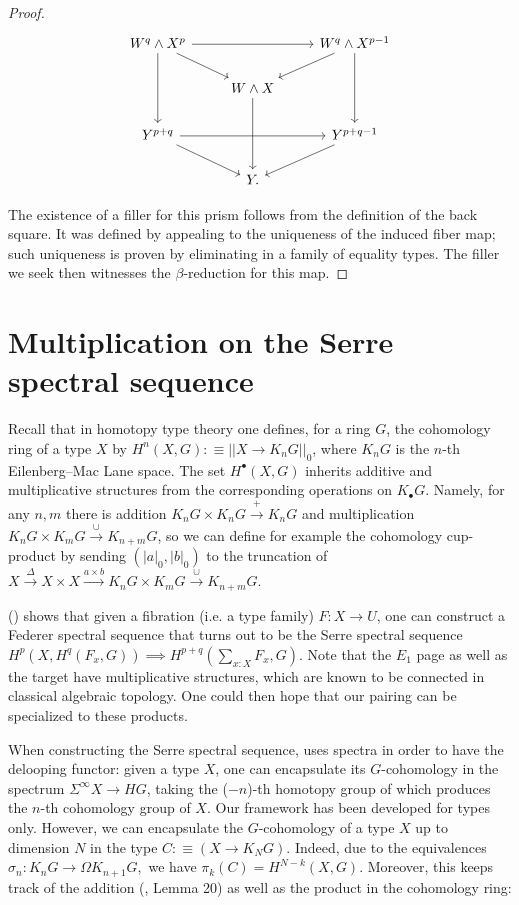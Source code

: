\documentclass{amsart}
\theoremstyle{definition}
\newcommand{\tot}[2]{\sum\limits_{#1}^{}{#2}}
\begin{document}
\begin{proof}
\[\begin{tikzcd}
	{W^q \wedge X^{p}} && {W^q \wedge X^{p-1}} \\
	& {W \wedge X} \\
	{Y^{p+q}} && {Y^{p+q-1}} \\
	& {Y.}
	\arrow[from=1-1, to=1-3]
	\arrow[from=1-1, to=2-2]
	\arrow[from=1-1, to=3-1]
	\arrow[from=1-3, to=2-2]
	\arrow[from=1-3, to=3-3]
	\arrow[from=2-2, to=4-2]
	\arrow[from=3-1, to=3-3]
	\arrow[from=3-1, to=4-2]
	\arrow[from=3-3, to=4-2]
\end{tikzcd}\]

The existence of a filler for this prism follows from the definition of the back square. It was defined by appealing to the uniqueness of the induced fiber map; such uniqueness is proven by eliminating in a family of equality types. The filler we seek then witnesses the $\beta$-reduction for this map.
\end{proof}

\section{Multiplication on the Serre spectral sequence}\label{se:SSS}

Recall that in homotopy type theory one defines, for a ring $G$, the cohomology ring of a type $X$ by $H^n(X, G) :\equiv ||X \to K_nG||_0$, where $K_nG$ is the $n$-th Eilenberg--Mac Lane space. The set $H^{\bullet}(X, G)$ inherits additive and multiplicative structures from the corresponding operations on $K_{\bullet}G$.
Namely, for any $n,m$ there is addition $K_n G \times K_n G \xrightarrow{+} K_n G$ and multiplication $K_n G \times K_m G \xrightarrow{\cup} K_{n+m} G$, so we can define for example the cohomology cup-product by sending $(|a|_0, |b|_0)$ to the truncation of $X \xrightarrow{\Delta} X \times X \xrightarrow{a \times b} K_{n} G \times K_{m} G \xrightarrow{\cup} K_{n+m} G$.

\cite{Flo} (\cite{NLab}) shows that given a fibration (i.e. a type family) $F: X \to U$, one can construct a Federer spectral sequence that turns out to be the Serre spectral sequence $H^p(X , H^q(F_x, G)) \implies H^{p+q}(\tot{x:X}{F_x}, G)$. Note that the $E_1$ page as well as the target have multiplicative structures, which are known to be connected in classical algebraic topology. One could then hope that our pairing can be specialized to these products.

When constructing the Serre spectral sequence, \cite{Flo} uses spectra in order to have the delooping functor: given a type $X$, one can encapsulate its $G$-cohomology in the spectrum $\Sigma^{\infty} X \to HG$, taking the ($-n$)-th homotopy group of which produces the $n$-th cohomology group of $X$. Our framework has been developed for types only. However, we can encapsulate the $G$-cohomology of a type $X$ up to dimension $N$ in the type $C :\equiv (X \to K_N G)$. Indeed, due to the equivalences $\sigma_n: K_nG \to \Omega K_{n+1}G,$ we have $\pi_k(C) = H^{N-k}(X, G)$. Moreover, this keeps track of the addition (\cite{LjuMor}, Lemma 20) as well as the product in the cohomology ring:
\end{document}
